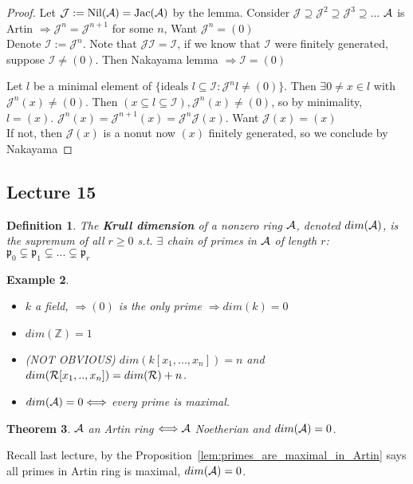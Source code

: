\documentclass[11pt]{article}
\newtheorem{thm}{Theorem}[section]
\newtheorem{dfn}[thm]{Definition}
\newtheorem{ex}[thm]{Example}
\newcommand{\intg}{\mathbb Z}
\newcommand{\scp}{{\mathfrak p}}
\newcommand{\cala}{{\cal A}}
\newcommand{\calr}{{\cal R}}
\newcommand{\Lrta}{\Longrightarrow}
\newcommand{\Llrta}{\Longleftrightarrow}
\begin{document}
\begin{proof}
Let $\mathcal{J}:= \text{Nil}(  \cala)=\text{Jac}(\cala)$ by the lemma. Consider $\mathcal{J}\supseteq \mathcal{J}^2\supseteq \mathcal{J}^3\supseteq ...$ $\cala$ is Artin $\Lrta \mathcal{J}^n=\mathcal{J}^{n+1}$ for some $n$, Want $\mathcal{J}^n=(0)$\\

Denote $\mathcal{I}:=\mathcal{J}^n$. Note that $\mathcal{J}\mathcal{I}=\mathcal{I}$, if we know that $\mathcal{I}$ were finitely generated, suppose $\mathcal{I}\neq (0)$. Then Nakayama lemma $\Lrta \mathcal{I}=(0)$

Let $l$ be a minimal element of $\{\text{ideals $l\subseteq \mathcal{I}:\mathcal{J}^nl\neq (0)$}\}$. Then $\exists 0\neq x\in l$ with $\mathcal{J}^n(x)\neq (0)$. Then $(x\subseteq l\subseteq \mathcal{I}), \mathcal{J}^n (x)\neq (0)$, so by minimality, $l=(x)$.
$\mathcal{J}^n(x)=\mathcal{J}^{n+1}(x)=\mathcal{J}^n\mathcal{J}(x)$.
Want $\mathcal{J}(x)=(x)$\\
If not, then $\mathcal{J}(x)$ is a nonut now $(x)$ finitely generated, so we conclude by Nakayama
\end{proof}
\subsection{Lecture 15}
\begin{dfn}
The \textbf{Krull dimension} of a nonzero ring $\cala$, denoted $dim(\cala)$, is the supremum of all $r\geq 0$ s.t. $\exists$ chain of primes in $\cala$ of length $r$: 
$\scp_0\subsetneq \scp_1\subsetneq...\subsetneq \scp_r$
\end{dfn}

\begin{ex}\ 
\begin{itemize}
\item $k$ a field, $\Lrta (0)$ is the only prime $\Lrta dim(k)=0$
\item $dim(\intg)=1$
\item (NOT OBVIOUS) $dim(k[x_1,...,x_n])=n$
 and $dim(\calr[x_1,..,x_n])=dim(\calr)+n$.
\item $dim(\cala)=0\Llrta $ every prime is maximal.  
\end{itemize}
\end{ex}

\begin{thm}\label{thm:Artin_equiv_Noetherin+dim=0}
$\cala$ an Artin ring $\Llrta\cala$ Noetherian and $dim(\cala)=0$.  
\end{thm}
Recall last lecture, by the Proposition~\ref{lem:primes_are_maximal_in_Artin} says all primes in Artin ring is maximal, $dim(\cala)=0$.
\end{document}
